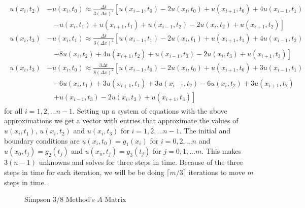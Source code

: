 \documentclass[00main.tex]{subfiles}
\begin{document}
\small\begin{align}
\begin{split}
u(x_i, t_2)&- u(x_i, t_0) \approx \frac{\Delta t}{3(\Delta x)^2} \left[ u(x_{i-1}, t_0) - 2 u(x_i, t_0) + u(x_{i+1}, t_0) + 4 u(x_{i-1}, t_1)\right. \\ &\quad \left. -u(x_i, t_1) +u(x_{i+1}, t_1) + u(x_{i-1}, t_2) - 2u(x_i, t_2) +u(x_{i+1}, t_2) \right] \\
u(x_i, t_3) &- u(x_i, t_1) \approx \frac{\Delta t}{3(\Delta x)^2} \left[ u(x_{i-1}, t_1) - 2 u(x_i, t_1) + u(x_{i+1}, t_1) + 4 u(x_{i-1}, t_2)\right. \\ &\quad \left. - 8u(x_i, t_2) + 4u(x_{i+1}, t_2) + u(x_{i-1}, t_3) - 2u(x_i, t_3) + u(x_{i+1}, t_3) \right] \\
u(x_i, t_3) &- u(x_i, t_0) \approx \frac{3\Delta t}{8(\Delta x)^2} \left[ u(x_{i-1}, t_0) - 2 u(x_i, t_0) + u(x_{i+1}, t_0) + 3 u(x_{i-1}, t_1)\right. \\ &\quad \left. - 6u(x_i, t_1) + 3u(x_{i+1}, t_1) + 3u(x_{i-1}, t_2) - 6u(x_i, t_2) + 3u(x_{i+1}, t_2)\right. \\ &\quad \left. + u(x_{i-1}, t_3) -2u(x_i, t_3) + u(x_{i+1}, t_3) \right] \label{syst_simp} \end{split}
\end{align}\normalsize for all $i = 1, 2, \hdots  n-1$. Setting up a system of equations with the above approximations we get a vector with entries that approximate the values of $u(x_i,t_1)$, $u(x_i,t_2)$ and $u(x_i,t_3)$ for $i = 1, 2, \hdots n-1$. The initial and boundary conditions are $u(x_i, t_0) = g_1(x_i)$ for $i = 0, 2, \hdots n$ and $u(x_0, t_j) = g_2(t_j)$ and $u(x_n, t_j) = g_3(t_j)$ for $j= 0, 1, \hdots m$. This makes $3(n-1)$ unknowns and solves for three steps in time. Because of the three steps in time for each iteration, we will be be doing $\lceil m/3 \rceil$ iterations to move $m$ steps in time.

\begin{figure}
\centering
\resizebox{0.5\textwidth}{!}{
}
\caption{Simpson 3/8 Method's $A$ Matrix}
\label{old_simp_A}
\end{figure}%
\end{document}
